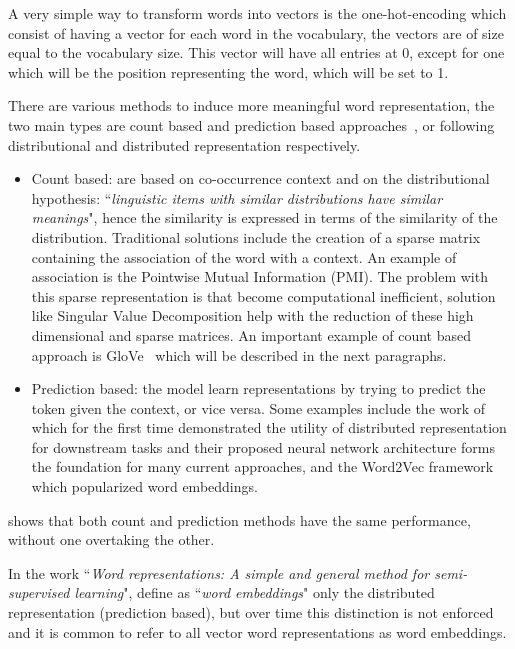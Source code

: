 A very simple way to transform words into vectors is the one-hot-encoding which consist of having a vector for each word in the vocabulary, the vectors are of size equal to the vocabulary size. This vector will have all entries at 0, except for one which will be the position representing the word, which will be set to 1. 

There are various methods to induce more meaningful word representation, the two main types are count based and prediction based approaches~\citep{baroni-etal-2014-dont}, or following~\cite{turian2010word} distributional and distributed representation respectively.


\begin{itemize}[- , itemsep = 0.1em]
\item Count based: are based on co-occurrence context and on the distributional hypothesis:  ``\textit{linguistic items with similar distributions have similar meanings}", hence the similarity is expressed in terms of the similarity of the distribution. Traditional solutions include the creation of a sparse matrix containing the association of the word with a context. An example of association is the Pointwise Mutual Information (PMI). The problem with this sparse representation is that become computational inefficient, solution like Singular Value Decomposition help with the reduction of these high dimensional and sparse matrices. An important example of count based approach is GloVe~\citep{pennington2014glove} which will be described in the next paragraphs.

\item Prediction based: 
the model learn representations by trying to predict the token given the context, or vice versa. Some examples include the work of \citet{collobert2008a} which for the first time demonstrated the utility of distributed representation for downstream tasks and their proposed neural network architecture forms the foundation for many current approaches, and the Word2Vec framework ~\citep{mikolov2013models,mikolov2013distributed} which popularized word embeddings.
\end{itemize}

\cite{levy-etal-2015-improving} shows that both count and prediction methods have the same performance, without one overtaking the other.


In the work ``\textit{Word representations: A simple and general method for semi-supervised learning}", \citet{turian2010word} define as ``\textit{word embeddings}" only the distributed representation (prediction based), but over time this distinction is not enforced and it is common to refer to all vector word representations as word embeddings. 

